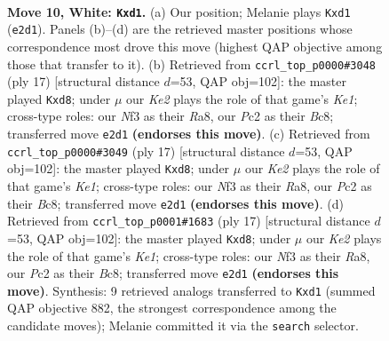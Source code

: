 \documentclass[11pt]{article}
\begin{document}
\clearpage

\begin{figure}[p]\centering
\begin{subfigure}{0.46\textwidth}\centering
\resizebox{\linewidth}{!}{%
\newchessgame
\chessboard[
  setfen={r1b1k2r/ppp1ppbp/1nn3p1/4P3/8/1B3N2/PPP1KPPP/RNBq2R1 w kq - 0 10},
  showmover=false,
  pgfstyle=straightmove, color=movearrow, markmove={e2-d1}
]}
\caption{}
\end{subfigure}\hfill
\begin{subfigure}{0.46\textwidth}\centering
\resizebox{\linewidth}{!}{%
\newchessgame
\chessboard[
  setfen={r1bQk1nr/1pp2ppp/1bn5/p3p3/2P5/P1N2N2/1P2PPPP/R1B1KB1R b KQkq - 0 9},
  showmover=false,
  pgfstyle=straightmove, color=movearrow, markmove={e8-d8}
]}
\caption{}
\end{subfigure}
\\[4pt]
\begin{subfigure}{0.46\textwidth}\centering
\resizebox{\linewidth}{!}{%
\newchessgame
\chessboard[
  setfen={r1bQk1nr/1pp2ppp/1bn5/p3p3/2P5/P1N2N2/1P2PPPP/R1B1KB1R b KQkq - 0 9},
  showmover=false,
  pgfstyle=straightmove, color=movearrow, markmove={e8-d8}
]}
\caption{}
\end{subfigure}\hfill
\begin{subfigure}{0.46\textwidth}\centering
\resizebox{\linewidth}{!}{%
\newchessgame
\chessboard[
  setfen={r1bQk1nr/1pp2ppp/1bn5/p3p3/2P5/P1N2N2/1P2PPPP/R1B1KB1R b KQkq - 0 9},
  showmover=false,
  pgfstyle=straightmove, color=movearrow, markmove={e8-d8}
]}
\caption{}
\end{subfigure}
\caption{\textbf{Move 10, White: \texttt{Kxd1}.} (a) Our position; Melanie plays \texttt{Kxd1} (\texttt{e2d1}). Panels (b)--(d) are the retrieved master positions whose correspondence most drove this move (highest QAP objective among those that transfer to it). (b) Retrieved from \texttt{ccrl\_top\_p0000\#3048} (ply 17) [structural distance $d$=53, QAP obj=102]: the master played \texttt{Kxd8}; under $\mu$ our \emph{Ke2} plays the role of that game's \emph{Ke1}; cross-type roles: our \emph{N}f3 as their \emph{R}a8, our \emph{P}c2 as their \emph{B}c8; transferred move \texttt{e2d1} \textbf{(endorses this move)}. (c) Retrieved from \texttt{ccrl\_top\_p0000\#3049} (ply 17) [structural distance $d$=53, QAP obj=102]: the master played \texttt{Kxd8}; under $\mu$ our \emph{Ke2} plays the role of that game's \emph{Ke1}; cross-type roles: our \emph{N}f3 as their \emph{R}a8, our \emph{P}c2 as their \emph{B}c8; transferred move \texttt{e2d1} \textbf{(endorses this move)}. (d) Retrieved from \texttt{ccrl\_top\_p0001\#1683} (ply 17) [structural distance $d$=53, QAP obj=102]: the master played \texttt{Kxd8}; under $\mu$ our \emph{Ke2} plays the role of that game's \emph{Ke1}; cross-type roles: our \emph{N}f3 as their \emph{R}a8, our \emph{P}c2 as their \emph{B}c8; transferred move \texttt{e2d1} \textbf{(endorses this move)}. Synthesis: 9 retrieved analogs transferred to \texttt{Kxd1} (summed QAP objective 882, the strongest correspondence among the candidate moves); Melanie committed it via the \texttt{search} selector.}
\label{fig:thought-m18}
\end{figure}
\end{document}

